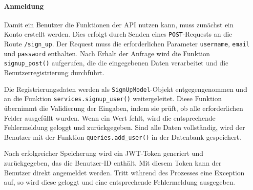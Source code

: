 \documentclass[12pt, letterpaper]{article}
\begin{document}
  \paragraph{Anmeldung}
  \par \textbf{}
  \par Damit ein Benutzer die Funktionen der API nutzen kann, muss zunächst ein Konto erstellt werden. Dies erfolgt durch Senden eines \texttt{POST}-Requests an die Route \texttt{/sign\_up}. Der Request muss die erforderlichen Parameter \texttt{username}, \texttt{email} und \texttt{password} enthalten. Nach Erhalt der Anfrage wird die Funktion \texttt{signup\_post()} aufgerufen, die die eingegebenen Daten verarbeitet und die Benutzerregistrierung durchführt.
  \par Die Registrierungsdaten werden als \texttt{SignUpModel}-Objekt entgegengenommen und an die Funktion \texttt{services.signup\_user()} weitergeleitet. Diese Funktion übernimmt die Validierung der Eingaben, indem sie prüft, ob alle erforderlichen Felder ausgefüllt wurden. Wenn ein Wert fehlt, wird die entsprechende Fehlermeldung geloggt und zurückgegeben. Sind alle Daten vollständig, wird der Benutzer mit der Funktion \texttt{queries.add\_user()} in der Datenbank gespeichert. 
  \par Nach erfolgreicher Speicherung wird ein JWT-Token generiert und zurückgegeben, das die Benutzer-ID enthält. Mit diesem Token kann der Benutzer direkt angemeldet werden. Tritt während des Prozesses eine Exception auf, so wird diese geloggt und eine entsprechende Fehlermeldung ausgegeben.
\end{document}
